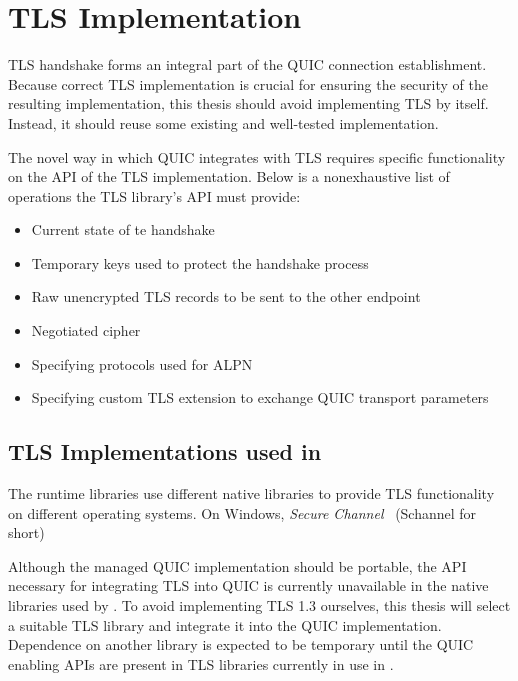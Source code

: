 \section{TLS Implementation}

TLS handshake forms an integral part of the QUIC connection establishment. Because correct TLS
implementation is crucial for ensuring the security of the resulting implementation, this thesis
should avoid implementing TLS by itself. Instead, it should reuse some existing and well-tested
implementation.

The novel way in which QUIC integrates with TLS requires specific functionality on the API of the
TLS implementation. Below is a nonexhaustive list of operations the TLS library's API must provide:

\begin{itemize}

  \item Current state of te handshake

  \item Temporary keys used to protect the handshake process

  \item Raw unencrypted TLS records to be sent to the other endpoint

  \item Negotiated cipher

  \item Specifying protocols used for ALPN

  \item Specifying custom TLS extension to exchange QUIC transport parameters

\end{itemize}

\subsection{TLS Implementations used in \dotnet{}}

The \dotnet{} runtime libraries use different native libraries to provide TLS functionality on
different operating systems. On Windows, \textit{Secure Channel}~\cite{Schannel} (Schannel for
short)


Although the managed QUIC implementation should be portable, the API necessary for integrating TLS
into QUIC is currently unavailable in the native libraries used by \dotnet{}. To avoid implementing
TLS 1.3 ourselves, this thesis will select a suitable TLS library and integrate it into the QUIC
implementation. Dependence on another library is expected to be temporary until the QUIC enabling
APIs are present in TLS libraries currently in use in \dotnet{}.

